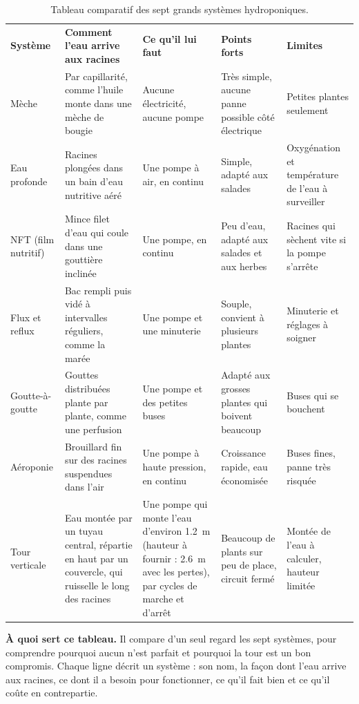 \documentclass[11pt,a4paper]{article}
\begin{document}
\begin{table}[H]
\centering
\footnotesize
\renewcommand{\arraystretch}{1.3}
\begin{tabularx}{\textwidth}{|>{\raggedright\arraybackslash}p{1.9cm}|Y|Y|Y|Y|}
\hline
{} \\
\hline
\textbf{Système} & \textbf{Comment l'eau arrive aux racines} & \textbf{Ce qu'il lui faut} & \textbf{Points forts} & \textbf{Limites} \\
\hline
Mèche & Par capillarité, comme l'huile monte dans une mèche de bougie & Aucune électricité, aucune pompe & Très simple, aucune panne possible côté électrique & Petites plantes seulement \\
\hline
Eau profonde & Racines plongées dans un bain d'eau nutritive aéré & Une pompe à air, en continu & Simple, adapté aux salades & Oxygénation et température de l'eau à surveiller \\
\hline
NFT (film nutritif) & Mince filet d'eau qui coule dans une gouttière inclinée & Une pompe, en continu & Peu d'eau, adapté aux salades et aux herbes & Racines qui sèchent vite si la pompe s'arrête \\
\hline
Flux et reflux & Bac rempli puis vidé à intervalles réguliers, comme la marée & Une pompe et une minuterie & Souple, convient à plusieurs plantes & Minuterie et réglages à soigner \\
\hline
Goutte-à-goutte & Gouttes distribuées plante par plante, comme une perfusion & Une pompe et des petites buses & Adapté aux grosses plantes qui boivent beaucoup & Buses qui se bouchent \\
\hline
Aéroponie & Brouillard fin sur des racines suspendues dans l'air & Une pompe à haute pression, en continu & Croissance rapide, eau économisée & Buses fines, panne très risquée \\
\hline
Tour verticale & Eau montée par un tuyau central, répartie en haut par un couvercle, qui ruisselle le long des racines & Une pompe qui monte l'eau d'environ \qty{1,2}{m} (hauteur à fournir : \qty{2,6}{m} avec les pertes), par cycles de marche et d'arrêt & Beaucoup de plants sur peu de place, circuit fermé & Montée de l'eau à calculer, hauteur limitée \\
\hline
\end{tabularx}
\caption{Tableau comparatif des sept grands systèmes hydroponiques.}
\end{table}

\textbf{À quoi sert ce tableau.} Il compare d'un seul regard les sept systèmes, pour comprendre pourquoi aucun n'est parfait et pourquoi la tour est un bon compromis. Chaque ligne décrit un système : son nom, la façon dont l'eau arrive aux racines, ce dont il a besoin pour fonctionner, ce qu'il fait bien et ce qu'il coûte en contrepartie.
\end{document}
